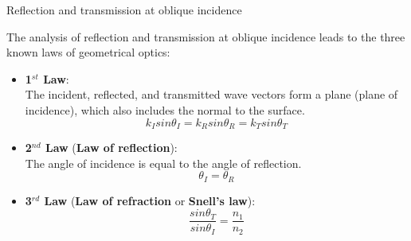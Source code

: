 %
%
%

\begin{frame}{Reflection and transmission at oblique incidence}

The analysis of reflection and transmission at oblique incidence
leads to the three known laws of geometrical optics:

\begin{itemize}
  \item {\bf 1$^{st}$ Law}:\\
     The incident, reflected, and transmitted wave vectors form a plane (plane of incidence),
     which also includes the normal to the surface.
     \begin{equation*}
          k_I sin\theta_I = k_R sin\theta_R = k_T sin\theta_T
      \end{equation*}
  \item {\bf 2$^{nd}$ Law} ({\bf Law of reflection}):\\
     The angle of incidence is equal to the angle of reflection.
     \begin{equation*}
          \theta_I = \theta_R
      \end{equation*}
  \item {\bf 3$^{rd}$ Law} ({\bf Law of refraction} or {\bf Snell's law}):\\
     \begin{equation*}
          \frac{sin\theta_T}{sin\theta_I} = \frac{n_1}{n_2}
      \end{equation*}

\end{itemize}

\end{frame}

%
%
%

